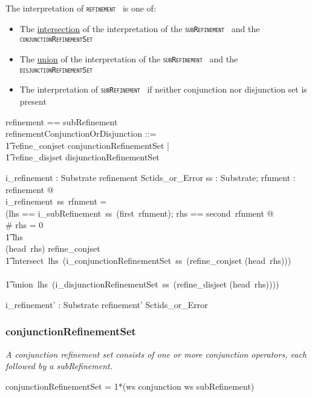 \documentclass{article}
\def\spec#1{{\tt \small \textsc{{#1}} }}
\def\bnf#1{{\scriptsize {{#1}} }}
\def\desc#1{{\small \textsl{{#1}} }}
\begin{document}
The interpretation of \spec{refinement} is one of:
\begin{itemize}[noitemsep,nolistsep]
\item The \underline{intersection} of the interpretation of the \spec{subRefinement} and the \spec{conjunctionRefinementSet}
\item The \underline{union} of the interpretation of the \spec{subRefinement} and the \spec{disjunctionRefinementSet}
\item The interpretation of  \spec{subRefinement} if neither conjunction nor disjunction set is present
\end{itemize}

\begin{zed}
refinement == subRefinement \cross \optional[refinementConjunctionOrDisjunction] \\
[refinement']
\also
refinementConjunctionOrDisjunction ::= \\
\t1 refine\_conjset \ldata conjunctionRefinementSet \rdata | \\
\t1 refine\_disjset \ldata disjunctionRefinementSet \rdata
\end{zed}




\begin{axdef}
   i\_refinement : Substrate \fun refinement \fun Sctids\_or\_Error
\where
   \forall ss : Substrate; rfnment : refinement @ \\
    i\_refinement~ss~rfnment = \\
   (\LET lhs == i\_subRefinement~ss~(first~rfnment); rhs == second~rfnment @ \\
   \IF \# rhs = 0 \THEN \\
   \t1 lhs \\
    \ELSE \IF (head~rhs) \in \ran refine\_conjset \THEN  \\
    \t1 intersect~lhs~(i\_conjunctionRefinementSet~ss~(refine\_conjset \inv (head~rhs))) \\
  \ELSE \\
  \t1 union~lhs~(i\_disjunctionRefinementSet~ss~(refine\_disjset \inv (head~rhs))))
\end{axdef}
\begin{axdef}
   i\_refinement' : Substrate \fun refinement' \fun Sctids\_or\_Error
\end{axdef}

\subsubsection{conjunctionRefinementSet}
\begin{framed}
\desc{A conjunction refinement set consists of one or more conjunction operators, each followed by a subRefinement.}
\end{framed}
\begin{framed}
\noindent
\bnf{conjunctionRefinementSet = 1*(ws conjunction ws subRefinement)}
\end{framed}
\end{document}
